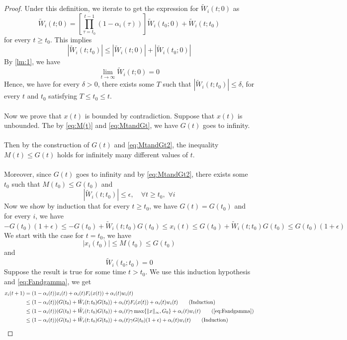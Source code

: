 \begin{proof}
Under this definition, we iterate to get the expression for $\tilde W_i(t;0)$ as
$$
\tilde W_i(t;0) = \left[\prod_{\tau = t_0}^{t-1} (1-\alpha_i(\tau))\right]\tilde W_i(t_0;0) + \tilde W_i(t;t_0)
$$
for every $t\ge t_0$. This implies
$$
|\tilde W_i(t;t_0)|\le |\tilde W_i(t;0)| + |\tilde W_i(t_0;0)|
$$
By \autoref{lm:1}, we have 
$$
\lim_{t\to\infty} \tilde W_i(t;0) = 0
$$
Hence, we have for every $\delta >0$, there exists some $T$ such that $|\tilde W_i(t;t_0)|\le \delta$, for every $t$ and $t_0$ satisfying $T\le t_0\le t$.\\
\\
Now we prove that $x(t)$ is bounded by contradiction. Suppose that $x(t)$ is unbounded. The by \autoref{eq:M(t)} and \autoref{eq:MtandGt}, we have $G(t)$ goes to infinity.\\
\\
Then by the construction of $G(t)$ and \autoref{eq:MtandGt2}, the inequality $M(t)\le G(t)$ holds for infinitely many different values of $t$.\\
\\
Moreover, since $G(t)$ goes to infinity and by \autoref{eq:MtandGt2}, there exists some $t_0$ such that $M(t_0)\le G(t_0)$ and
\begin{equation}\label{eq:tildeWgoesto0}
    |\tilde W_i(t;t_0)|\le \epsilon,\quad \forall t\ge t_0,\,\,\forall i
\end{equation}
Now we show by induction that for every $t\ge t_0$, we have $G(t)=G(t_0)$ and for every $i$, we have
$$
-G(t_0)(1+\epsilon) \le -G(t_0) + \tilde W_i(t;t_0)G(t_0)\le x_i(t)\le G(t_0) + \tilde W_i(t;t_0)G(t_0)\le G(t_0)(1+\epsilon)
$$
We start with the case for $t=t_0$, we have
$$
|x_i(t_0)|\le M(t_0)\le G(t_0)
$$
and
$$
\tilde W_i(t_0;t_0) = 0
$$
Suppose the result is true for some time $t>t_0$. We use this induction hypothesis and \autoref{eq:Fandgamma}, we get
\begin{align*}
    x_i(t+1) &= (1-\alpha_i(t))x_i(t) + \alpha_i(t)F_i(x(t)) + \alpha_i(t)w_i(t)\\
    &\le (1-\alpha_i(t))(G(t_0) + \tilde W_i(t;t_0)G(t_0)) + \alpha_i(t)F_i(x(t)) + \alpha_i(t)w_i(t)\tag{Induction}\\
    &\le (1-\alpha_i(t))(G(t_0) + \tilde W_i(t;t_0)G(t_0)) + \alpha_i(t)\gamma\max\{\|x\|_\infty,G_0\} + \alpha_i(t)w_i(t)\tag{\autoref{eq:Fandgamma}}\\
    &\le (1-\alpha_i(t))(G(t_0) + \tilde W_i(t;t_0)G(t_0)) + \alpha_i(t)\gamma G(t_0)(1+\epsilon)+ \alpha_i(t)w_i(t)\tag{Induction}\\

\end{align*}
\end{proof}
